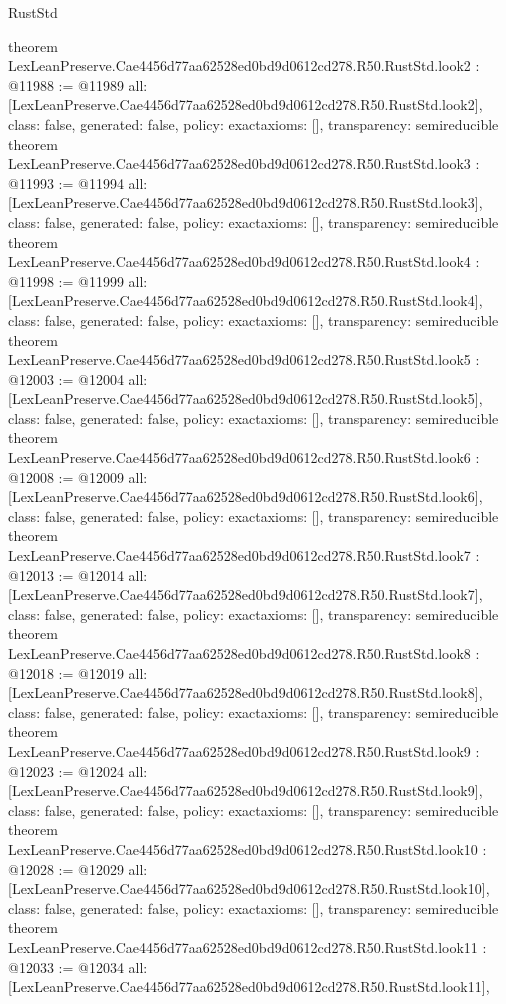 \begin{lexlean}{RustStd}
\begin{coremodule}
{}
theorem LexLeanPreserve.Cae4456d77aa62528ed0bd9d0612cd278.R50.RustStd.look2 : @11988 := @11989 {
  all: [LexLeanPreserve.Cae4456d77aa62528ed0bd9d0612cd278.R50.RustStd.look2],
  class: false,
  generated: false,
  policy: exact{axioms: []},
  transparency: semireducible
}
theorem LexLeanPreserve.Cae4456d77aa62528ed0bd9d0612cd278.R50.RustStd.look3 : @11993 := @11994 {
  all: [LexLeanPreserve.Cae4456d77aa62528ed0bd9d0612cd278.R50.RustStd.look3],
  class: false,
  generated: false,
  policy: exact{axioms: []},
  transparency: semireducible
}
theorem LexLeanPreserve.Cae4456d77aa62528ed0bd9d0612cd278.R50.RustStd.look4 : @11998 := @11999 {
  all: [LexLeanPreserve.Cae4456d77aa62528ed0bd9d0612cd278.R50.RustStd.look4],
  class: false,
  generated: false,
  policy: exact{axioms: []},
  transparency: semireducible
}
theorem LexLeanPreserve.Cae4456d77aa62528ed0bd9d0612cd278.R50.RustStd.look5 : @12003 := @12004 {
  all: [LexLeanPreserve.Cae4456d77aa62528ed0bd9d0612cd278.R50.RustStd.look5],
  class: false,
  generated: false,
  policy: exact{axioms: []},
  transparency: semireducible
}
theorem LexLeanPreserve.Cae4456d77aa62528ed0bd9d0612cd278.R50.RustStd.look6 : @12008 := @12009 {
  all: [LexLeanPreserve.Cae4456d77aa62528ed0bd9d0612cd278.R50.RustStd.look6],
  class: false,
  generated: false,
  policy: exact{axioms: []},
  transparency: semireducible
}
theorem LexLeanPreserve.Cae4456d77aa62528ed0bd9d0612cd278.R50.RustStd.look7 : @12013 := @12014 {
  all: [LexLeanPreserve.Cae4456d77aa62528ed0bd9d0612cd278.R50.RustStd.look7],
  class: false,
  generated: false,
  policy: exact{axioms: []},
  transparency: semireducible
}
theorem LexLeanPreserve.Cae4456d77aa62528ed0bd9d0612cd278.R50.RustStd.look8 : @12018 := @12019 {
  all: [LexLeanPreserve.Cae4456d77aa62528ed0bd9d0612cd278.R50.RustStd.look8],
  class: false,
  generated: false,
  policy: exact{axioms: []},
  transparency: semireducible
}
theorem LexLeanPreserve.Cae4456d77aa62528ed0bd9d0612cd278.R50.RustStd.look9 : @12023 := @12024 {
  all: [LexLeanPreserve.Cae4456d77aa62528ed0bd9d0612cd278.R50.RustStd.look9],
  class: false,
  generated: false,
  policy: exact{axioms: []},
  transparency: semireducible
}
theorem LexLeanPreserve.Cae4456d77aa62528ed0bd9d0612cd278.R50.RustStd.look10 : @12028 := @12029 {
  all: [LexLeanPreserve.Cae4456d77aa62528ed0bd9d0612cd278.R50.RustStd.look10],
  class: false,
  generated: false,
  policy: exact{axioms: []},
  transparency: semireducible
}
theorem LexLeanPreserve.Cae4456d77aa62528ed0bd9d0612cd278.R50.RustStd.look11 : @12033 := @12034 {
  all: [LexLeanPreserve.Cae4456d77aa62528ed0bd9d0612cd278.R50.RustStd.look11],
}
\end{coremodule}
\end{lexlean}
